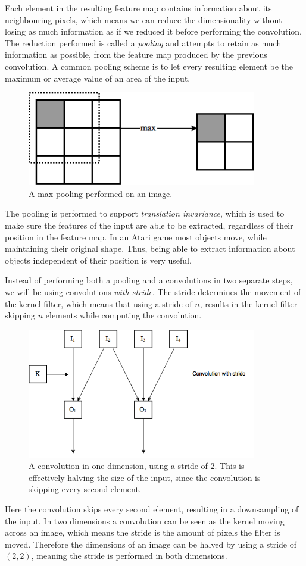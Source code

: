 \documentclass[11pt]{article}
\begin{document}
Each element in the resulting feature map contains information about
its neighbouring pixels, which means we can reduce the dimensionality
without losing as much information as if we reduced it before performing the convolution.
The reduction performed is called a \textit{pooling} and attempts to retain
as much information as possible, from the feature map produced by the previous convolution. 
A common pooling scheme is to let every resulting element be the maximum
or average value of an area of the input.
\begin{figure}[H]
    \centering
    \includegraphics[width=10cm]{include/pooling.png}
    \caption{A max-pooling performed on an image.}
\end{figure}
The pooling is performed to support \textit{translation invariance},
which is used to make sure the features of the input are able to
be extracted, regardless of their position in the feature map.
In an Atari game most objects move, while maintaining their original shape.
Thus, being able to
extract information about objects independent of their position is very useful.

Instead of performing both a pooling and a convolutions in two separate steps,
we will be using convolutions \textit{with stride}.
The stride determines the movement of the kernel filter, which means that
using a stride of $n$, results in the kernel filter skipping $n$ elements 
while computing the convolution.
\begin{figure}[!h]\label{con2}
    \centering
    \includegraphics[width=10cm]{include/strides.png}
    \caption{A convolution in one dimension, using a stride of 2.
             This is effectively halving the size of the input, since
             the convolution is skipping every second element.}
    \label{fig:conv}
\end{figure}
Here the convolution skips every second element, resulting in a downsampling
of the input.
In two dimensions a convolution can be seen as the kernel moving across
an image, which means the stride is the amount of pixels the filter is moved.
Therefore the dimensions of an image can be halved by using a stride of $(2, 2)$, meaning
the stride is performed in both dimensions.
\end{document}
